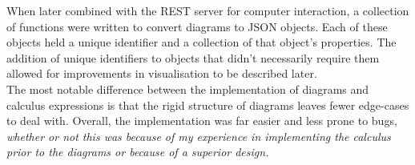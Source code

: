         When later combined with the REST server for computer interaction, a collection of functions were written to convert diagrams to JSON objects.
        Each of these objects held a unique identifier and a collection of that object's properties.
        The addition of unique identifiers to objects that didn't necessarily require them allowed for improvements in visualisation to be described later.\\

        The most notable difference between the implementation of diagrams and calculus expressions is that the rigid structure of diagrams leaves fewer edge-cases to deal with.
        Overall, the implementation was far easier and less prone to bugs, \textit{whether or not this was because of my experience in implementing the calculus prior to the diagrams or because of a superior design.}
